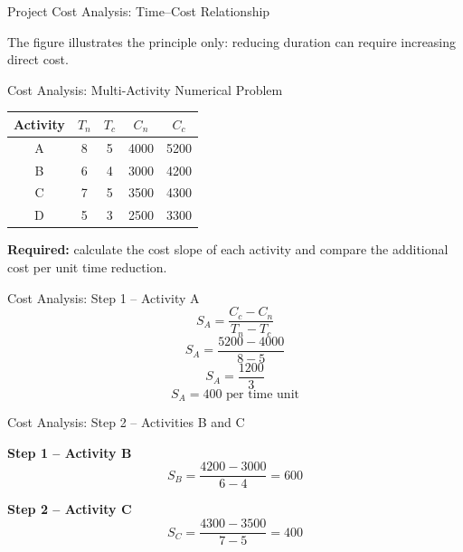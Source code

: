 \documentclass[aspectratio=169,10pt]{beamer}
\begin{document}
\begin{frame}{Project Cost Analysis: Time--Cost Relationship}
\centering
{}
\vspace{0.2cm}

The figure illustrates the principle only: reducing duration can require increasing direct cost.
\end{frame}

\begin{frame}{Cost Analysis: Multi-Activity Numerical Problem}
\centering\small
\begin{tabular}{c|cccc}
\toprule Activity & $T_n$ & $T_c$ & $C_n$ & $C_c$\\
\midrule
A&8&5&4000&5200\\
B&6&4&3000&4200\\
C&7&5&3500&4300\\
D&5&3&2500&3300\\
\bottomrule
\end{tabular}
\vspace{0.25cm}
\textbf{Required:} calculate the cost slope of each activity and compare the additional cost per unit time reduction.
\end{frame}

\begin{frame}{Cost Analysis: Step 1 -- Activity A}
\[S_A=\frac{C_c-C_n}{T_n-T_c}\]
\pause
\[S_A=\frac{5200-4000}{8-5}\]
\pause
\[S_A=\frac{1200}{3}\]
\pause
\[\boxed{S_A=400\text{ per time unit}}\]
\end{frame}

\begin{frame}{Cost Analysis: Step 2 -- Activities B and C}
\small
\par\textbf{Step 1 -- Activity B}
\[
S_B=\frac{4200-3000}{6-4}=\boxed{600}
\]
\pause
\par\textbf{Step 2 -- Activity C}
\[
S_C=\frac{4300-3500}{7-5}=\boxed{400}
\]
\end{frame}
\end{document}

